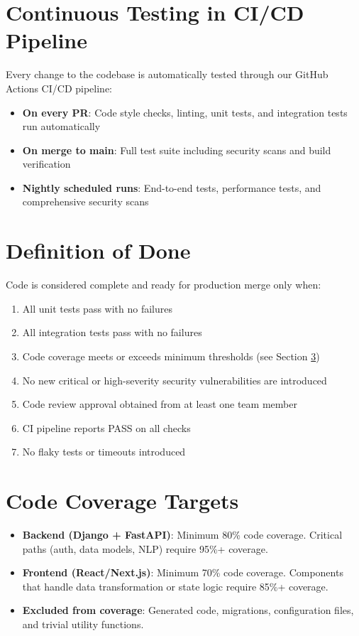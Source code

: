 \documentclass{report}
\begin{document}
\section{Continuous Testing in CI/CD Pipeline}

Every change to the codebase is automatically tested through our GitHub Actions CI/CD pipeline:

\begin{itemize}
  \item \textbf{On every PR}: Code style checks, linting, unit tests, and integration tests run automatically
  \item \textbf{On merge to main}: Full test suite including security scans and build verification
  \item \textbf{Nightly scheduled runs}: End-to-end tests, performance tests, and comprehensive security scans
\end{itemize}

\section{Definition of Done}

Code is considered complete and ready for production merge only when:

\begin{enumerate}
  \item All unit tests pass with no failures
  \item All integration tests pass with no failures
  \item Code coverage meets or exceeds minimum thresholds (see Section \ref{sec:coverage})
  \item No new critical or high-severity security vulnerabilities are introduced
  \item Code review approval obtained from at least one team member
  \item CI pipeline reports PASS on all checks
  \item No flaky tests or timeouts introduced
\end{enumerate}

\section{Code Coverage Targets}
\label{sec:coverage}

\begin{itemize}
  \item \textbf{Backend (Django + FastAPI)}: Minimum 80\% code coverage. Critical paths (auth, data models, NLP) require 95\%+ coverage.
  \item \textbf{Frontend (React/Next.js)}: Minimum 70\% code coverage. Components that handle data transformation or state logic require 85\%+ coverage.
  \item \textbf{Excluded from coverage}: Generated code, migrations, configuration files, and trivial utility functions.
\end{itemize}
\end{document}
